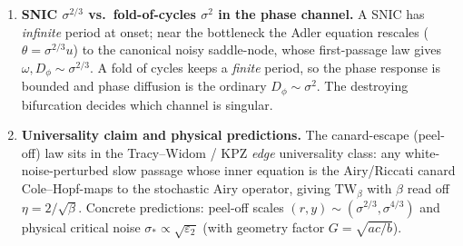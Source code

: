 \documentclass[11pt]{article}
\newcommand{\TW}{\mathrm{TW}}
\newcommand{\ep}{\varepsilon_2}
\theoremstyle{definition}
\begin{document}
\begin{enumerate}[leftmargin=1.6em,itemsep=0.5em]
\item \textbf{SNIC $\sigma^{2/3}$ vs.\ fold-of-cycles $\sigma^2$ in the phase channel.}
A SNIC has \emph{infinite} period at onset; near the bottleneck the Adler equation rescales
($\theta=\sigma^{2/3}u$) to the canonical noisy saddle-node, whose first-passage law gives
$\omega,D_\phi\sim\sigma^{2/3}$. A fold of cycles keeps a \emph{finite} period, so the phase
response is bounded and phase diffusion is the ordinary $D_\phi\sim\sigma^2$. The destroying
bifurcation decides which channel is singular.

\item \textbf{Universality claim and physical predictions.}
The canard-escape (peel-off) law sits in the Tracy--Widom / KPZ \emph{edge} universality class: any
white-noise-perturbed slow passage whose inner equation is the Airy/Riccati canard Cole--Hopf-maps
to the stochastic Airy operator, giving $\TW_\beta$ with $\beta$ read off $\eta=2/\sqrt\beta$.
Concrete predictions: peel-off scales $(r,y)\sim(\sigma^{2/3},\sigma^{4/3})$ and physical critical
noise $\sigma_*\propto\sqrt{\ep}$ (with geometry factor $G=\sqrt{ac/b}$).
\end{enumerate}
\end{document}
